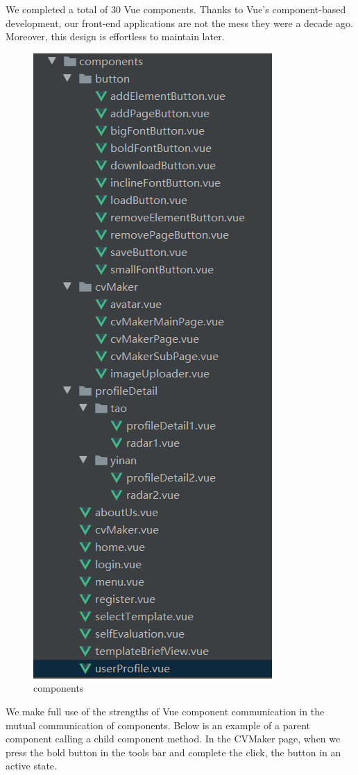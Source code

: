 \documentclass[11pt]{article}
\begin{document}
\begin{spacing}{1.0}
	We completed a total of 30 Vue components. Thanks to Vue's component-based development, our front-end applications are not the mess they were a decade ago. Moreover, this design is effortless to maintain later.
	\begin{figure}[H]
		\centering
		\includegraphics[scale=.5]{figures/components.png}
		\caption{components}
		\label{fig:7}
	\end{figure}

We make full use of the strengths of Vue component communication in the mutual communication of components. Below is an example of a parent component calling a child component method. In the CVMaker page, when we press the bold button in the tools bar and complete the click, the button in an active state.


\end{spacing}
\end{document}
